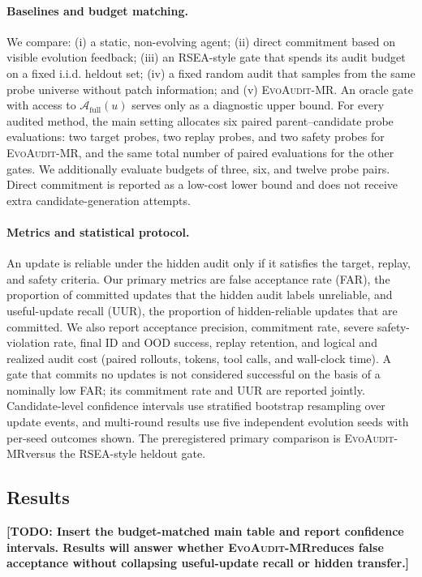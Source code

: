 \documentclass{article}
\newcommand{\method}{\textsc{EvoAudit-MR}}
\newcommand{\TODO}[1]{\textbf{[TODO: #1]}}
\begin{document}
\paragraph{Baselines and budget matching.}
We compare: (i) a static, non-evolving agent; (ii) direct commitment based on visible evolution feedback; (iii) an RSEA-style gate that spends its audit budget on a fixed i.i.d. heldout set; (iv) a fixed random audit that samples from the same probe universe without patch information; and (v) \method. An oracle gate with access to $\mathcal{A}_{\mathrm{full}}(u)$ serves only as a diagnostic upper bound. For every audited method, the main setting allocates six paired parent--candidate probe evaluations: two target probes, two replay probes, and two safety probes for \method, and the same total number of paired evaluations for the other gates. We additionally evaluate budgets of three, six, and twelve probe pairs. Direct commitment is reported as a low-cost lower bound and does not receive extra candidate-generation attempts.

\paragraph{Metrics and statistical protocol.}
An update is reliable under the hidden audit only if it satisfies the target, replay, and safety criteria. Our primary metrics are false acceptance rate (FAR), the proportion of committed updates that the hidden audit labels unreliable, and useful-update recall (UUR), the proportion of hidden-reliable updates that are committed. We also report acceptance precision, commitment rate, severe safety-violation rate, final ID and OOD success, replay retention, and logical and realized audit cost (paired rollouts, tokens, tool calls, and wall-clock time). A gate that commits no updates is not considered successful on the basis of a nominally low FAR; its commitment rate and UUR are reported jointly. Candidate-level confidence intervals use stratified bootstrap resampling over update events, and multi-round results use five independent evolution seeds with per-seed outcomes shown. The preregistered primary comparison is \method versus the RSEA-style heldout gate.

\subsection{Results}

\TODO{Insert the budget-matched main table and report confidence intervals. Results will answer whether \method reduces false acceptance without collapsing useful-update recall or hidden transfer.}
\end{document}
